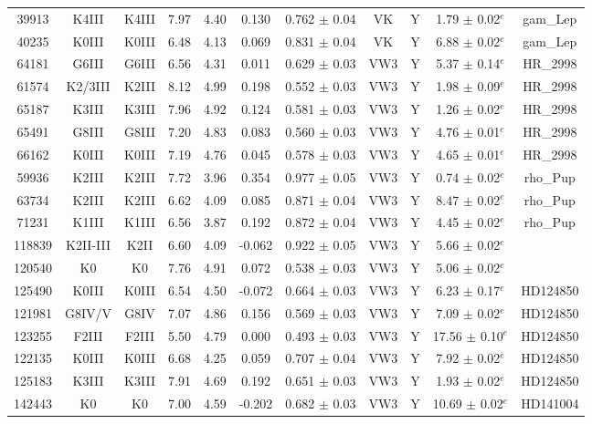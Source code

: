 \begin{tabular}{ccccccccccc}
39913 & K4III & K4III & 7.97 & 4.40 & 0.130 & 0.762 $\pm$ 0.04 & VK & Y & 1.79 $\pm$ 0.02$^e$ &gam_Lep\\
40235 & K0III & K0III & 6.48 & 4.13 & 0.069 & 0.831 $\pm$ 0.04 & VK & Y & 6.88 $\pm$ 0.02$^e$ &gam_Lep\\
64181 & G6III & G6III & 6.56 & 4.31 & 0.011 & 0.629 $\pm$ 0.03 & VW3 & Y & 5.37 $\pm$ 0.14$^e$ &HR_2998\\
61574 & K2/3III & K2III & 8.12 & 4.99 & 0.198 & 0.552 $\pm$ 0.03 & VW3 & Y & 1.98 $\pm$ 0.09$^e$ &HR_2998\\
65187 & K3III & K3III & 7.96 & 4.92 & 0.124 & 0.581 $\pm$ 0.03 & VW3 & Y & 1.26 $\pm$ 0.02$^e$ &HR_2998\\
65491 & G8III & G8III & 7.20 & 4.83 & 0.083 & 0.560 $\pm$ 0.03 & VW3 & Y & 4.76 $\pm$ 0.01$^e$ &HR_2998\\
66162 & K0III & K0III & 7.19 & 4.76 & 0.045 & 0.578 $\pm$ 0.03 & VW3 & Y & 4.65 $\pm$ 0.01$^e$ &HR_2998\\
59936 & K2III & K2III & 7.72 & 3.96 & 0.354 & 0.977 $\pm$ 0.05 & VW3 & Y & 0.74 $\pm$ 0.02$^e$ &rho_Pup\\
63734 & K2III & K2III & 6.62 & 4.09 & 0.085 & 0.871 $\pm$ 0.04 & VW3 & Y & 8.47 $\pm$ 0.02$^e$ &rho_Pup\\
71231 & K1III & K1III & 6.56 & 3.87 & 0.192 & 0.872 $\pm$ 0.04 & VW3 & Y & 4.45 $\pm$ 0.02$^e$ &rho_Pup\\
118839 & K2II-III & K2II & 6.60 & 4.09 & -0.062 & 0.922 $\pm$ 0.05 & VW3 & Y & 5.66 $\pm$ 0.02$^e$ &\\
120540 & K0 & K0 & 7.76 & 4.91 & 0.072 & 0.538 $\pm$ 0.03 & VW3 & Y & 5.06 $\pm$ 0.02$^e$ &\\
125490 & K0III & K0III & 6.54 & 4.50 & -0.072 & 0.664 $\pm$ 0.03 & VW3 & Y & 6.23 $\pm$ 0.17$^e$ &HD124850\\
121981 & G8IV/V & G8IV & 7.07 & 4.86 & 0.156 & 0.569 $\pm$ 0.03 & VW3 & Y & 7.09 $\pm$ 0.02$^e$ &HD124850\\
123255 & F2III & F2III & 5.50 & 4.79 & 0.000 & 0.493 $\pm$ 0.03 & VW3 & Y & 17.56 $\pm$ 0.10$^e$ &HD124850\\
122135 & K0III & K0III & 6.68 & 4.25 & 0.059 & 0.707 $\pm$ 0.04 & VW3 & Y & 7.92 $\pm$ 0.02$^e$ &HD124850\\
125183 & K3III & K3III & 7.91 & 4.69 & 0.192 & 0.651 $\pm$ 0.03 & VW3 & Y & 1.93 $\pm$ 0.02$^e$ &HD124850\\
142443 & K0 & K0 & 7.00 & 4.59 & -0.202 & 0.682 $\pm$ 0.03 & VW3 & Y & 10.69 $\pm$ 0.02$^e$ &HD141004\\

\end{tabular}
